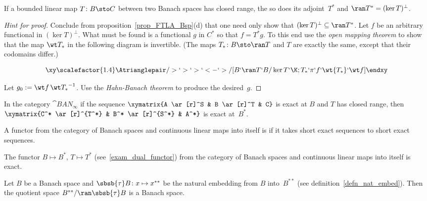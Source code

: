 \begin{prop} If a bounded linear map $T\colon B \sto C$ between two Banach spaces has closed range, the so does its
adjoint~$T^*$ and $\ran T^* = (\ker T)^\perp$.
\end{prop}

\begin{proof}[\emph{Hint for proof}] Conclude from proposition~\ref{prop_FTLA_Bsp}(d) that one need only show that
$(\ker T)^\perp \subseteq \ran T^*$.  Let $f$ be an arbitrary functional in $(\ker T)^\perp$. What must be found is a
functional $g$ in $C^*$ so that $f = T^*g$.  To this end use the \emph{open mapping theorem} to show that the map $\wt T_\ast$
in the following diagram is invertible. (The maps $T_\ast\colon B \sto \ran T$ and $T$ are exactly the same, except that their
codomains differ.)

 \[\xy
    \scalefactor{1.4}%
    \Atrianglepair/>`>`>`<-`>/[B`\ran T`B/\ker T`\K;T_\ast`\pi`f`\wt{T_\ast}`\wt f]
 \endxy\]

Let $g_0 := \wt f\,{\wt T_\ast}^{-1}$. Use the \emph{Hahn-Banach theorem} to produce the desired~$g$.   \ns
\end{proof}

\begin{prop} In the category $\cat{BAN_\infty}$ if the sequence $\xymatrix{A \ar[r]^S & B \ar[r]^T & C}$ is exact at $B$
and $T$ has closed range, then $\xymatrix{C^* \ar[r]^{T^*} & B^* \ar[r]^{S^*} & A^*}$ is exact at~$B^*$.
\end{prop}

\begin{defn} A functor from the category of Banach spaces and continuous linear maps into itself is
 if it takes short exact sequences to short exact sequences.
\end{defn}

\begin{exam}\label{exam_dualfunctor_exact} The functor $B \mapsto B^*$, $T \mapsto T^*$ (see~\ref{exam_dual_functor})
from the category of Banach spaces and continuous linear maps into itself is exact.
\end{exam}

\begin{exam} Let $B$ be a Banach space and $\sbsb{\tau}B\colon x \mapsto x^{**}$ be the natural embedding from $B$ into~$B^{**}$
(see definition~\ref{defn_nat_embed}). Then the quotient space $B^{**}/\ran\sbsb{\tau}B$ is a Banach space.
\end{exam}

